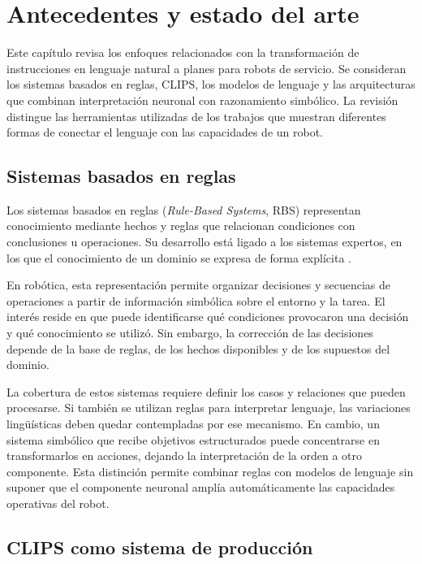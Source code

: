 \chapter{Antecedentes y estado del arte}

Este capítulo revisa los enfoques relacionados con la transformación de instrucciones en lenguaje natural a planes para robots de servicio. Se consideran los sistemas basados en reglas, CLIPS, los modelos de lenguaje y las arquitecturas que combinan interpretación neuronal con razonamiento simbólico. La revisión distingue las herramientas utilizadas de los trabajos que muestran diferentes formas de conectar el lenguaje con las capacidades de un robot.

\section{Sistemas basados en reglas}

Los sistemas basados en reglas (\textit{Rule-Based Systems}, RBS) representan conocimiento mediante hechos y reglas que relacionan condiciones con conclusiones u operaciones. Su desarrollo está ligado a los sistemas expertos, en los que el conocimiento de un dominio se expresa de forma explícita \cite{Giarratano2005,Russell2020}.

En robótica, esta representación permite organizar decisiones y secuencias de operaciones a partir de información simbólica sobre el entorno y la tarea. El interés reside en que puede identificarse qué condiciones provocaron una decisión y qué conocimiento se utilizó. Sin embargo, la corrección de las decisiones depende de la base de reglas, de los hechos disponibles y de los supuestos del dominio.

La cobertura de estos sistemas requiere definir los casos y relaciones que pueden procesarse. Si también se utilizan reglas para interpretar lenguaje, las variaciones lingüísticas deben quedar contempladas por ese mecanismo. En cambio, un sistema simbólico que recibe objetivos estructurados puede concentrarse en transformarlos en acciones, dejando la interpretación de la orden a otro componente. Esta distinción permite combinar reglas con modelos de lenguaje sin suponer que el componente neuronal amplía automáticamente las capacidades operativas del robot.

\section{CLIPS como sistema de producción}

